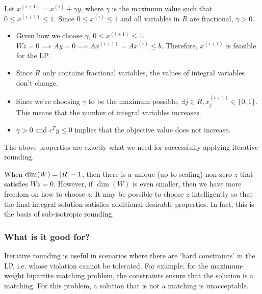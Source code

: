 Let $x^{(i+1)} = x^{(i)} + \gamma y$, where
$\gamma$ is the maximum value such that $0 \le x^{(i+1)} \le 1$.
Since $0 \le x^{(i)} \le 1$ and all variables in $R$ are fractional, $\gamma > 0$.
\begin{itemize}
\item Given how we choose $\gamma$, $0 \le x^{(i+1)} \le 1$.
$Wz = 0 \implies Ay = 0 \implies Ax^{(i+1)} = Ax^{(i)} \le b$.
Therefore, $x^{(i+1)}$ is feasible for the LP.
\item Since $R$ only contains fractional variables,
the values of integral variables don't change.
\item Since we're choosing $\gamma$ to be the maximum possible,
$\exists j \in R, x^{(i+1)}_j \in \{0, 1\}$.
This means that the number of integral variables increases.
\item $\gamma > 0$ and $c^Ty \le 0$ implies that the objective value does not increase.
\end{itemize}

The above properties are exactly what we need for successfully applying iterative rounding.

When $\dim(W) = \left\lvert R \right\rvert-1$, then there is a unique (up to scaling) non-zero $z$
that satisfies $Wz = 0$. However, if $\dim(W)$ is even smaller,
then we have more freedom on how to choose $z$.
It may be possible to choose $z$ intelligently so that the final integral solution
satisfies additional desirable properties.
In fact, this is the basis of sub-isotropic rounding.

\subsubsection{What is it good for?}

Iterative rounding is useful in scenarios where there are `hard constraints' in the LP,
i.e. whose violation cannot be tolerated.
For example, for the maximum-weight bipartite matching problem,
the constraints ensure that the solution is a matching.
For this problem, a solution that is not a matching is unacceptable.
